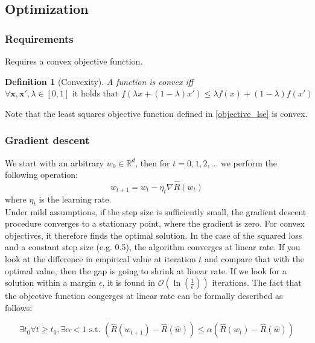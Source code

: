 \documentclass[a4paper,10pt,twoside]{article}
\newtheorem{definition}{Definition}[section]
\begin{document}
\subsection{Optimization}
\subsubsection{Requirements}
Requires a convex objective function.
\begin{definition}[Convexity]
    A function is convex iff $\forall \mathbf{x},\mathbf{x}', \lambda\in[0,1] \text{ it holds that } f(\lambda x+(1-\lambda)x')\leq \lambda f(x)+(1-\lambda)f(x')$
\end{definition}
Note that the least squares objective function defined in \ref{objective_lse} is convex.
\subsubsection{Gradient descent}
We start with an arbitrary $w_0\in\mathbb{R}^d$, then for $t=0,1,2,\ldots$ we perform the following operation:
\begin{equation*}
    w_{t+1} = w_t -\eta_t\nabla\hat{R}(w_t)
\end{equation*}
where $\eta_t$ is the learning rate.\\
Under mild assumptions, if the step size is sufficiently small, the gradient descent procedure converges to a stationary point, where the gradient is zero. For convex objectives, it therefore finds the optimal solution. In the case of the squared loss and a constant step size (e.g. 0.5), the algorithm converges at linear rate. If you look at the difference in empirical value at iteration $t$ and compare that with the optimal value, then the gap is going to shrink at linear rate. If we look for a solution within a margin $\epsilon$, it is found in $\mathcal{O}(\ln(\frac{1}{\epsilon}))$ iterations. The fact that the objective function congerges at linear rate can be formally described
as follows:

\begin{equation*}
    \exists t_0 \forall t\geq t_0, \exists \alpha<1 \text{ s.t. } (\hat{R}(w_{t+1})-\hat{R}(\hat{w}))\leq\alpha(\hat{R}(w_{t})-\hat{R}(\hat{w}))
\end{equation*}
\end{document}
